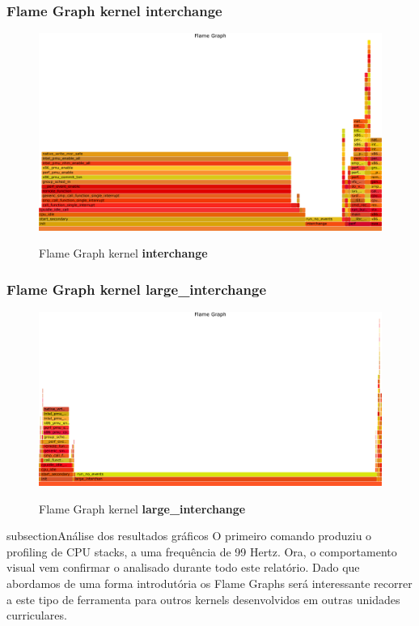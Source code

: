 \documentclass[conference,compsoc]{IEEEtran}
\begin{document}
    \subsubsection{Flame Graph kernel \textbf{interchange}}
    \begin{figure}[H]
    \centering
    \caption{ Flame Graph kernel \textbf{interchange} }
    \includegraphics[width=1\columnwidth]{PNG/perf_kernel_interchange.png}
    \label{fig:flame_naive}
    \end{figure}

    \subsubsection{Flame Graph kernel \textbf{large\_interchange}}
    \begin{figure}[H]
    \centering
    \caption{ Flame Graph kernel \textbf{large\_interchange} }
    \includegraphics[width=1\columnwidth]{PNG/perf_kernel_large_interchange.png}
    \label{fig:flame_naive}
    \end{figure}


    subsection{Análise dos resultados gráficos}
    O primeiro comando produziu o profiling de CPU stacks, a uma frequência de 99 Hertz. Ora, o comportamento visual vem confirmar o analisado durante todo este relatório. Dado que abordamos de uma forma introdutória os Flame Graphs será interessante recorrer a este tipo de ferramenta para outros kernels desenvolvidos em outras unidades curriculares.
\end{document}
